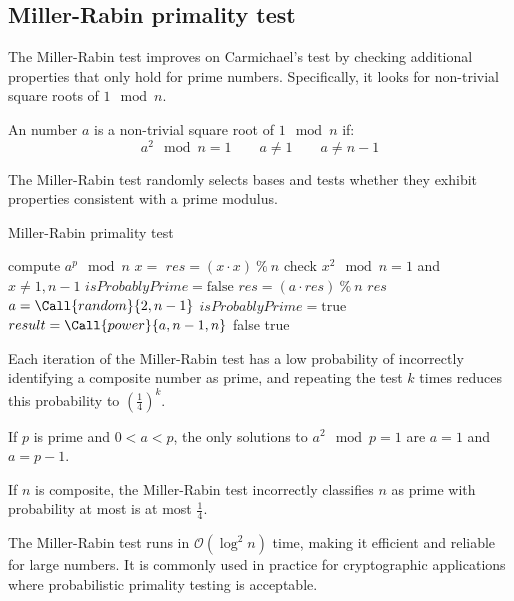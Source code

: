 \subsection{Miller-Rabin primality test}
The Miller-Rabin test improves on Carmichael's test by checking additional properties that only hold for prime numbers. 
Specifically, it looks for non-trivial square roots of $1\mod n$. 
\begin{definition}
    An number $a$ is a non-trivial square root of $1 \mod n$ if: 
    \[a^2 \mod n = 1 \qquad a \neq 1 \qquad a \neq n - 1\]
\end{definition}
The Miller-Rabin test randomly selects bases and tests whether they exhibit properties consistent with a prime modulus.
\begin{algorithm}[H]
    \caption{Miller-Rabin primality test}
    \begin{algorithmic}[1]
             \Comment compute $a^p \mod n$
                \State {}
            \EndIf 
            \State $x=$ 
            \State $res= (x \cdot x)\:\%\:n$
             \Comment check $x^2 \mod n = 1$ and $x \neq 1, n-1$
                \State $isProbablyPrime=\text{false}$
            \EndIf
                \State $res=(a\cdot res)\:\%\:n$
            \EndIf
            \State \Return $res$
        \EndFunction
        \Statex 
            \State $a = \Call{random}{2, n-1}$
            \State $isProbablyPrime = \text{true}$
            \State $result = \Call{power}{a, n-1, n}$
                \State \Return false
            \Else
                \State \Return true
            \EndIf
        \EndFunction
    \end{algorithmic}
\end{algorithm}
Each iteration of the Miller-Rabin test has a low probability of incorrectly identifying a composite number as prime, and repeating the test $k$ times reduces this probability to $\left(\frac{1}{4}\right)^k$. 
\begin{theorem}
    If $p$ is prime and $0 < a < p$, the only solutions to $a^2 \mod p = 1$ are $a = 1$ and $a = p - 1$.
\end{theorem}
\begin{theorem}
    If $n$ is composite, the Miller-Rabin test incorrectly classifies $n$ as prime with probability at most is at most $\frac{1}{4}$.
\end{theorem}
The Miller-Rabin test runs in $\mathcal{O}(\log^2n)$ time, making it efficient and reliable for large numbers. 
It is commonly used in practice for cryptographic applications where probabilistic primality testing is acceptable.